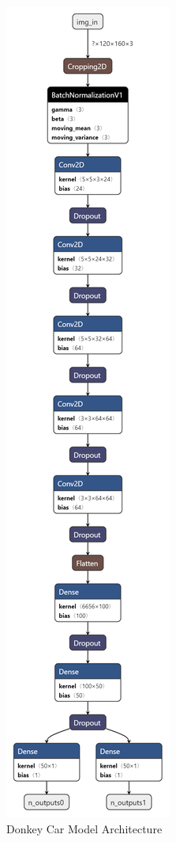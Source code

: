 \begin{figure}%
    \center%

      \includegraphics[width=.3\textwidth]{images/Learningprocess/model.png}%
    \caption[Donkey Car Model Architecture]{Donkey Car Model Architecture}\label{fig: Donkey Car Model Architecture}%
 \end{figure}

